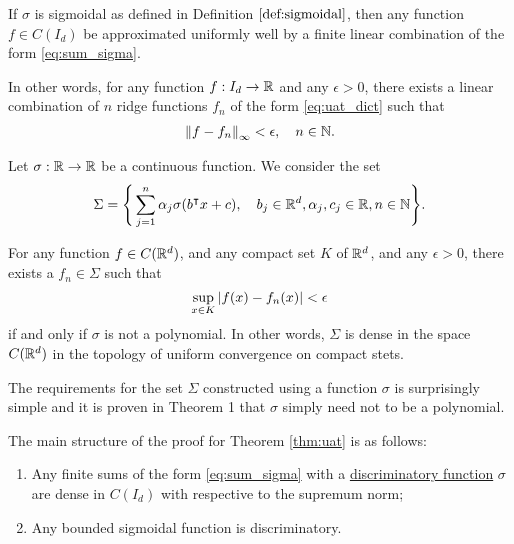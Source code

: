 \begin{theorem}
    \label{thm:uat}
    If $\sigma$ is sigmoidal as defined in Definition $\ref{def:sigmoidal}$,
    then any function $f \in C(I_d)$ be approximated uniformly well by a finite
    linear combination of the form \eqref{eq:sum_sigma}.

    In other words, for any function $f: I_d \to \mathbb{R}$ and any $\epsilon > 0$,
    there exists a linear combination of $n$ ridge functions $f_n$ of the form
    \eqref{eq:uat_dict} such that
    \begin{align}
        \left\| f - f_n \right\|_{\infty} < \epsilon, \quad n \in \mathbb{N}.
    \end{align}
\end{theorem}

\begin{proposition}
    Let $\sigma: \mathbb{R} \to \mathbb{R}$ be a continuous function. We consider the set
    \begin{equation}
        \Sigma = \Bigg\{
            \sum_{j=1}^n \alpha_j \sigma(b{}^{\intercal} x + c), \quad
            b_j \in \mathbb{R}^d, \alpha_j, c_j \in \mathbb{R}, n\in\mathbb{N}
        \Bigg\}.
    \end{equation}

    For any function $f \in C(\mathbb{R}^d)$, and any compact set $K$ of $\mathbb{R}^d$, and any
    $\epsilon > 0$, there exists a $f_n \in \Sigma$ such that 
    \begin{equation}
        \sup_{x\in K} \left| f(x) - f_n(x) \right| < \epsilon
    \end{equation}
    if and only if $\sigma$ is not a polynomial. In other words, $\Sigma$ is
    dense in the space $C(\mathbb{R}^d)$ in the topology of uniform convergence on
    compact stets.
\end{proposition}

\begin{remark}
    The requirements for the set $\Sigma$ constructed using a function $\sigma$
    is surprisingly simple and it is proven in Theorem 1
    \cite[p. 10]{leshnoMultilayerFeedforwardNetworks1993} that $\sigma$ simply need not
    to be a polynomial.
\end{remark}

The main structure of the proof for Theorem \ref{thm:uat} is as follows:
\begin{enumerate}
    \item Any finite sums of the form \eqref{eq:sum_sigma} with a
    \hyperref[def:dis_func]{discriminatory function} $\sigma$ are dense in
    $C(I_d)$ with respective to the supremum norm;
    \item Any bounded sigmoidal function is discriminatory.
\end{enumerate}

